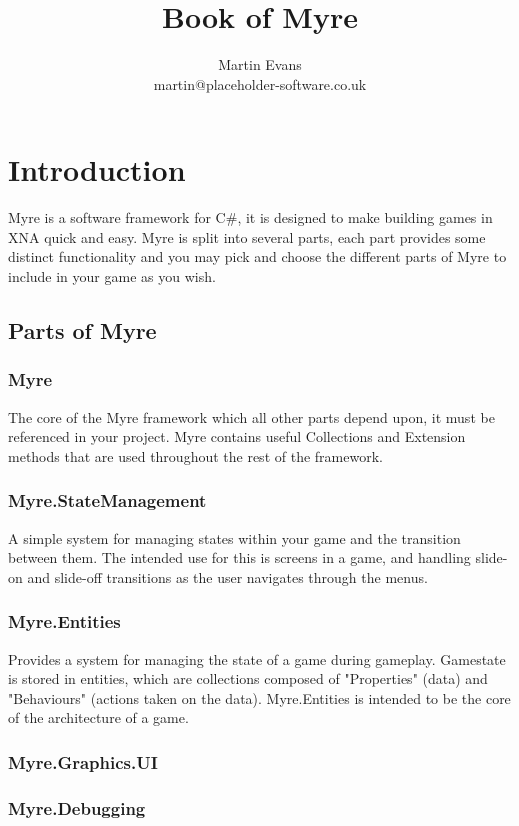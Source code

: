 \documentclass{article}
\title{Book of Myre}
\author{Martin Evans\\martin@placeholder-software.co.uk}
\date{}
\begin{document}
\maketitle

\tableofcontents
\pagebreak[4]

\section{Introduction}
Myre is a software framework for C\#, it is designed to make building games in XNA quick and easy. Myre is split into several parts, each part provides some distinct functionality and you may pick and choose the different parts of Myre to include in your game as you wish.

\subsection{Parts of Myre}
\subsubsection{Myre}
The core of the Myre framework which all other parts depend upon, it must be referenced in your project. Myre contains useful Collections and Extension methods that are used throughout the rest of the framework.
\subsubsection{Myre.StateManagement}
A simple system for managing states within your game and the transition between them. The intended use for this is screens in a game, and handling slide-on and slide-off transitions as the user navigates through the menus.
\subsubsection{Myre.Entities}
Provides a system for managing the state of a game during gameplay. Gamestate is stored in entities, which are collections composed of "Properties" (data) and "Behaviours" (actions taken on the data). Myre.Entities is intended to be the core of the architecture of a game.
\subsubsection{Myre.Graphics.UI}
\subsubsection{Myre.Debugging}
\end{document}
